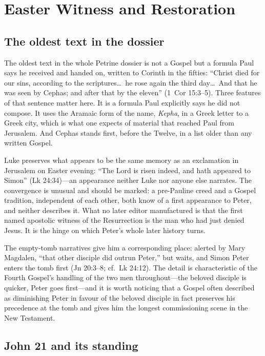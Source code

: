 \section{Easter Witness and Restoration}

\subsection{The oldest text in the dossier}

The oldest text in the whole Petrine dossier is not a Gospel but a formula
Paul says he received and handed on, written to Corinth in the fifties:
``Christ died for our sins, according to the scriptures\ldots\ he rose again
the third day\ldots\ And that he was seen by Cephas; and after that by the
eleven'' (1~Cor 15:3--5). Three features of that sentence matter here. It is
a formula Paul explicitly says he did not compose. It uses the Aramaic form
of the name, \textit{Kepha}, in a Greek letter to a Greek city, which is what
one expects of material that reached Paul from Jerusalem. And Cephas stands
first, before the Twelve, in a list older than any written Gospel.

Luke preserves what appears to be the same memory as an exclamation in
Jerusalem on Easter evening: ``The Lord is risen indeed, and hath appeared to
Simon'' (Lk 24:34)---an appearance neither Luke nor anyone else narrates. The
convergence is unusual and should be marked: a pre-Pauline creed and a Gospel
tradition, independent of each other, both know of a first appearance to
Peter, and neither describes it. What no later editor manufactured is that
the first named apostolic witness of the Resurrection is the man who had just
denied Jesus. It is the hinge on which Peter's whole later history turns.

The empty-tomb narratives give him a corresponding place: alerted by Mary
Magdalen, ``that other disciple did outrun Peter,'' but waits, and Simon
Peter enters the tomb first (Jn 20:3--8; cf.\ Lk 24:12). The detail is
characteristic of the Fourth Gospel's handling of the two men
throughout---the beloved disciple is quicker, Peter goes first---and it is
worth noticing
that a Gospel often described as diminishing Peter in favour of the beloved
disciple in fact preserves his precedence at the tomb and gives him the
longest commissioning scene in the New Testament.

\subsection{John 21 and its standing}

